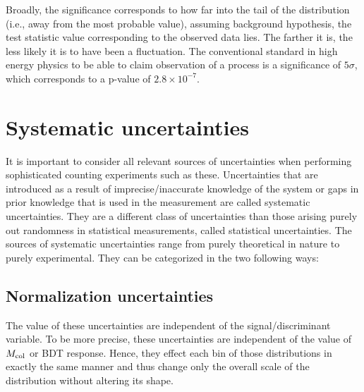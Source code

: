 Broadly, the significance corresponds to how far into the tail of the distribution (i.e., away from the most probable value), assuming background hypothesis, the test statistic value corresponding to the observed data lies. The farther it is, the less likely it is to have been a fluctuation. The conventional standard in high energy physics to be able to claim observation of a process is a significance of $5\sigma$, which corresponds to a p-value of $2.8\times 10^{-7}$.


\section{Systematic uncertainties}
\label{exp_uncert}
It is important to consider all relevant sources of uncertainties when performing sophisticated counting experiments such as these. Uncertainties that are introduced as a result of imprecise/inaccurate knowledge of the system or gaps in prior knowledge that is used in the measurement are called systematic uncertainties. They are a different class of uncertainties than those arising purely out randomness in statistical measurements, called statistical uncertainties. The sources of systematic uncertainties range from purely theoretical in nature to purely experimental. They can be categorized in the two following ways:
\subsection{Normalization uncertainties}
The value of these uncertainties are independent of the signal/discriminant variable. To be more precise, these uncertainties are independent of the value of $M_{\text{col}}$ or BDT response. Hence, they effect each bin of those distributions in exactly the same manner and thus change only the overall scale of the distribution without altering its shape.

